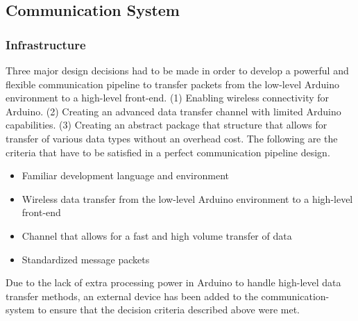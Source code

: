 \documentclass[11pt,a4paper,oldfontcommands]{memoir}
\begin{document}
																																																																																	   \subsection{Communication System}
																																																																																	   \subsubsection{Infrastructure}
																																																																																	   Three major design decisions had to be made in order to develop a powerful and flexible communication pipeline to transfer packets from the low-level Arduino environment to a high-level front-end. (1) Enabling wireless connectivity for Arduino. (2) Creating an advanced data transfer channel with limited Arduino capabilities. (3) Creating an abstract package that structure that allows for transfer of various data types without an overhead cost. The following are the criteria that have to be satisfied in a perfect communication pipeline design.

																																																																																	   \begin{itemize}
																																																																																	       \item Familiar development language and environment
																																																																																	           \item Wireless data transfer from the low-level Arduino environment to a high-level front-end
																																																																																		       \item Channel that allows for a fast and high volume transfer of data
																																																																																		           \item Standardized message packets
																																																																																			   \end{itemize}

																																																																																			   Due to the lack of extra processing power in Arduino to handle high-level data transfer methods, an external device has been added to the communication-system to ensure that the decision criteria described above were met.
\end{document}
